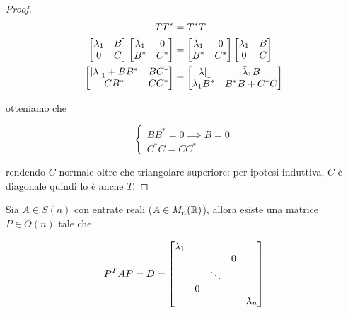 \begin{proof}
	\begin{align}
		\begin{split}
			T T^{*} &= T^{*} T\\
			\bmqty{ %
					\lambda_{1} & B \\
					0 & C %
					} %
			\bmqty{ %
					\bar{\lambda}_{1} & 0 \\
					B^{*} & C^{*} %
					}
			&= %
			\bmqty{ %
						\bar{\lambda}_{1} & 0 \\
						B^{*} & C^{*} %
						}
			\bmqty{ %
					\lambda_{1} & B \\
					0 & C %
					} \\
			\bmqty{ %
					\abs{\lambda}_{1} + B B^{*} & B C^{*} \\
					C B^{*} & C C^{*} %
					}
			&= %
			\bmqty{ %
					\abs{\lambda}_{1} & \bar{\lambda}_{1} B \\
					\lambda_{1} B^{*} & B^{*} B + C^{*} C %
					}
		\end{split}
	\end{align}

	otteniamo che
	
	\begin{equation}
		\begin{cases}
			B B^{*} = 0 \implies B = 0 \\
			C^{*} C = C C^{*}
		\end{cases}
	\end{equation}

	rendendo $ C $ normale oltre che triangolare superiore: per ipotesi induttiva, $ C $ è diagonale quindi lo è anche $ T $.
\end{proof}

\begin{corollary}
	Sia $ A \in S(n) $ con entrate reali ($ A \in M_{n}(\mathbb{R}) $), allora esiste una matrice $ P \in O(n) $ tale che
	
	\begin{equation}
		P^{T} A P = D = %
		\bmqty{ %
				\dmat{ %
						\lambda_{1},
						& & 0 \\ & \ddots & \\ 0 & & ,
						\lambda_{n}
						}
				}
	\end{equation}
\end{corollary}

